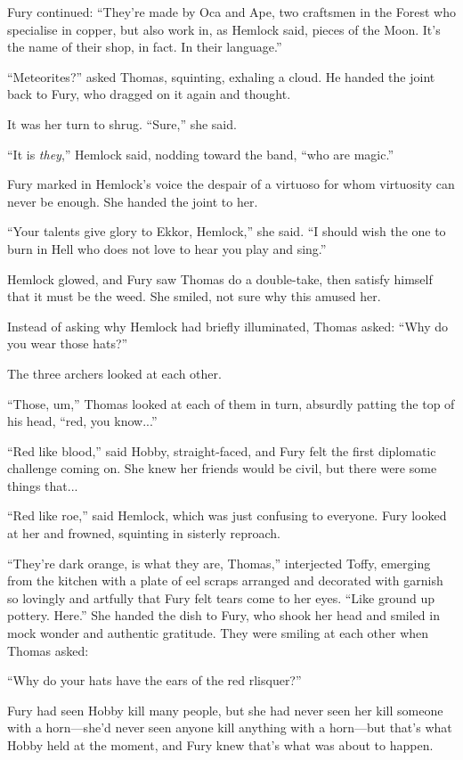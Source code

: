 \documentclass[11pt,a5paper]{article}
\begin{document}
Fury continued: ``They're made by Oca and Ape, two craftsmen in the Forest who specialise in copper, but also work in, as Hemlock said, pieces of the Moon. It's the name of their shop, in fact. In their language.''

``Meteorites?'' asked Thomas, squinting, exhaling a cloud. He handed the joint back to Fury, who dragged on it again and thought.

It was her turn to shrug. ``Sure,'' she said.

``It is \emph{they},'' Hemlock said, nodding toward the band, ``who are magic.''

Fury marked in Hemlock's voice the despair of a virtuoso for whom virtuosity can never be enough. She handed the joint to her.

``Your talents give glory to Ekkor, Hemlock,'' she said. ``I should wish the one to burn in Hell who does not love to hear you play and sing.''

Hemlock glowed, and Fury saw Thomas do a double-take, then satisfy himself that it must be the weed. She smiled, not sure why this amused her.

Instead of asking why Hemlock had briefly illuminated, Thomas asked: ``Why do you wear those hats?''

The three archers looked at each other.

``Those, um,'' Thomas looked at each of them in turn, absurdly patting the top of his head, ``red, you know...''

``Red like blood,'' said Hobby, straight-faced, and Fury felt the first diplomatic challenge coming on. She knew her friends would be civil, but there were some things that...

``Red like roe,'' said Hemlock, which was just confusing to everyone. Fury looked at her and frowned, squinting in sisterly reproach.

``They're dark orange, is what they are, Thomas,'' interjected Toffy, emerging from the kitchen with a plate of eel scraps arranged and decorated with garnish so lovingly and artfully that Fury felt tears come to her eyes. ``Like ground up pottery. Here.'' She handed the dish to Fury, who shook her head and smiled in mock wonder and authentic gratitude. They were smiling at each other when Thomas asked:

``Why do your hats have the ears of the red rlisquer?''

Fury had seen Hobby kill many people, but she had never seen her kill someone with a horn---she'd never seen anyone kill anything with a horn---but that's what Hobby held at the moment, and Fury knew that's what was about to happen.
\end{document}

